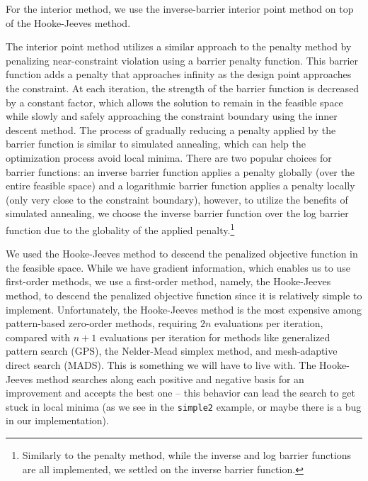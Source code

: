 \documentclass[conference]{IEEEtran}
\begin{document}
For the interior method, we use the inverse-barrier interior point method on top of the Hooke-Jeeves method.

The interior point method utilizes a similar approach to the penalty method by penalizing near-constraint violation using a barrier penalty function. This barrier function adds a penalty that approaches infinity as the design point approaches the constraint. At each iteration, the strength of the barrier function is decreased by a constant factor, which allows the solution to remain in the feasible space while slowly and safely approaching the constraint boundary using the inner descent method. The process of gradually reducing a penalty applied by the barrier function is similar to simulated annealing, which can help the optimization process avoid local minima. There are two popular choices for barrier functions: an inverse barrier function applies a penalty globally (over the entire feasible space) and a logarithmic barrier function applies a penalty locally (only very close to the constraint boundary), however, to utilize the benefits of simulated annealing, we choose the inverse barrier function over the log barrier function due to the globality of the applied penalty.\footnote{Similarly to the penalty method, while the inverse and log barrier functions are all implemented, we settled on the inverse barrier function.}

We used the Hooke-Jeeves method to descend the penalized objective function in the feasible space. While we have gradient information, which enables us to use first-order methods, we use a first-order method, namely, the Hooke-Jeeves method, to descend the penalized objective function since it is relatively simple to implement. Unfortunately, the Hooke-Jeeves method is the most expensive among pattern-based zero-order methods, requiring $2n$ evaluations per iteration, compared with $n+1$ evaluations per iteration for methods like generalized pattern search (GPS), the Nelder-Mead simplex method, and mesh-adaptive direct search (MADS). This is something we will have to live with. The Hooke-Jeeves method searches along each positive and negative basis for an improvement and accepts the best one -- this behavior can lead the search to get stuck in local minima (as we see in the \texttt{simple2} example, or maybe there is a bug in our implementation).


\end{document}
